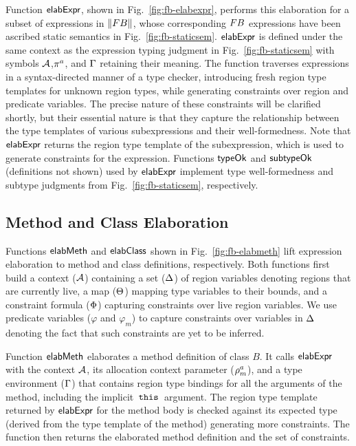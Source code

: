 Function ${\sf elabExpr}$, shown in Fig.~\ref{fig:fb-elabexpr}, performs
this elaboration for a subset of expressions in $\left\| {\sc FB} \right\|$, whose
corresponding ${\sc FB}$ expressions have been ascribed static semantics in
Fig.~\ref{fig:fb-staticsem}. ${\sf elabExpr}$ is defined under the same
context as the expression typing judgment in
Fig.~\ref{fig:fb-staticsem} with symbols ${\mathcal{A}}$,$\pi^a$, and $\Gamma$
retaining their meaning. The function traverses expressions in a
syntax-directed manner of a type checker, introducing fresh region
type templates for unknown region types, while generating constraints
over region and predicate variables. The precise nature of these
constraints will be clarified shortly, but their essential nature is
that they capture the relationship between the type templates of
various subexpressions and their well-formedness. Note that
${\sf elabExpr}$ returns the region type template of the subexpression,
which is used to generate constraints for the expression. Functions
${\sf typeOk}$ and ${\sf subtypeOk}$ (definitions not shown) used by ${\sf elabExpr}$
implement type well-formedness and subtype judgments from
Fig.~\ref{fig:fb-staticsem}, respectively.

\subsection{Method and Class Elaboration}

Functions ${\sf elabMeth}$ and ${\sf elabClass}$ shown in
Fig.~\ref{fig:fb-elabmeth} lift expression elaboration to method and
class definitions, respectively. Both functions first build a context
(${\mathcal{A}}$) containing a set ($ \Delta$) of region variables denoting
regions that are currently live, a map ($\Theta$) mapping type
variables to their bounds, and a constraint formula ($\Phi$)
capturing constraints over live region variables. We use predicate
variables ($\varphi$ and $\varphi_m$) to capture constraints over
variables in $\Delta$ denoting the fact that such constraints are yet
to be inferred.

Function ${\sf elabMeth}$ elaborates a method definition of class $B$. It
calls ${\sf elabExpr}$ with the context ${\mathcal{A}}$, its allocation context
parameter ($\rho^a_m$), and a type environment ($\Gamma$) that
contains region type bindings for all the arguments of the method,
including the implicit $\,{\tt this}\,$ argument. The region type template
returned by ${\sf elabExpr}$ for the method body is checked against its
expected type (derived from the type template of the method)
generating more constraints. The function then returns the elaborated
method definition and the set of constraints.

